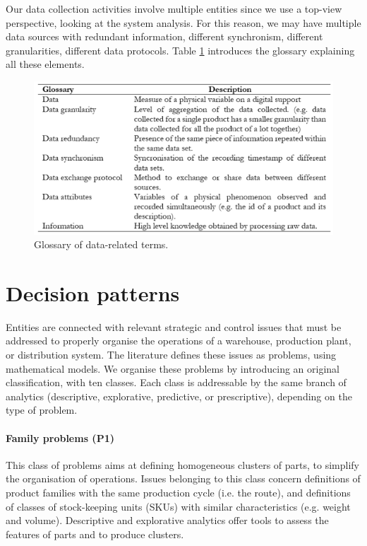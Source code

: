 Our data collection activities involve multiple entities since we use a top-view perspective, looking at the system analysis. For this reason, we may have multiple data sources with redundant information, different synchronism, different granularities, different data protocols. Table \ref{tab_data_glossary} introduces the glossary explaining all these elements.

\begin{figure}[hbt!]
\centering
\includegraphics[width=1\textwidth]{SectionIntroduction/dataDrivenDecisions_fig/tab_data_glossary.png}
\captionsetup{type=table}
\caption{Glossary of data-related terms.}
\label{tab_data_glossary}
\end{figure}

\section{Decision patterns} \label{secDecisionPatterns}
Entities are connected with relevant strategic and control issues that must be addressed to properly organise the operations of a warehouse, production plant, or distribution system. The literature defines these issues as problems, using mathematical models. We organise these problems by introducing an original classification, with ten classes. Each class is addressable by the same branch of analytics (descriptive, explorative, predictive, or prescriptive), depending on the type of problem. 

\paragraph{Family problems (P1)}
This class of problems aims at defining homogeneous clusters of parts, to simplify the organisation of operations. Issues belonging to this class concern definitions of product families with the same production cycle (i.e. the route), and definitions of classes of stock-keeping units (SKUs) with similar characteristics (e.g. weight and volume). Descriptive and explorative analytics offer tools to assess the features of parts and to produce clusters. 

